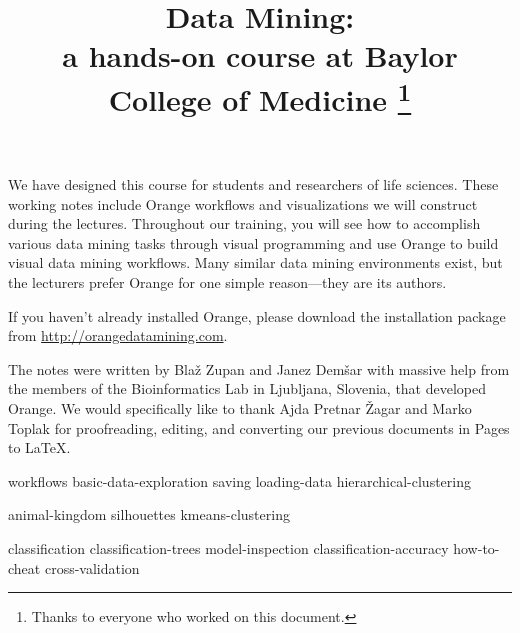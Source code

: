 \documentclass[symmetric, justified, a4paper, nofonts]{tufte-book}
\title{Data Mining: \\ {\large a hands-on course at Baylor College of Medicine}
\thanks{Thanks to everyone who worked on this document.}}
\author{}
\begin{document}
\frontmatter

\maketitle

We have designed this course for students and researchers of life sciences. These working notes include Orange workflows and visualizations we will construct during the lectures. Throughout our training, you will see how to accomplish various data mining tasks through visual programming and use Orange to build visual data mining workflows. Many similar data mining environments exist, but the lecturers prefer Orange for one simple reason—they are its authors.

If you haven't already installed Orange, please download the installation package from \url{http://orangedatamining.com}.

The notes were written by Blaž Zupan and Janez Demšar with massive help from the members of the Bioinformatics Lab in Ljubljana, Slovenia, that developed Orange. We would specifically like to thank Ajda Pretnar Žagar and Marko Toplak for proofreading, editing, and converting our previous documents in Pages to LaTeX.



\tableofcontents

\mainmatter

{workflows}
{basic-data-exploration}
{saving}
{loading-data}
{hierarchical-clustering}

{animal-kingdom}
{silhouettes}
{kmeans-clustering}

{classification}
{classification-trees}
{model-inspection}
{classification-accuracy}
{how-to-cheat}
{cross-validation}
\end{document}
